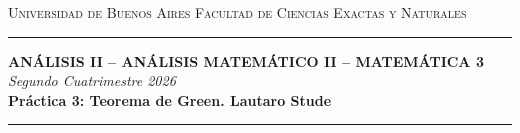 \documentclass[11pt, a4paper]{article}
\begin{document}
	
	\begin{center}
		\textsc{Universidad de Buenos Aires} \hfill \textsc{Facultad de Ciencias Exactas y Naturales} \\
		\vspace{0.15cm}
		\hrule
		\vspace{0.4cm}
		\textbf{\Large ANÁLISIS II -- ANÁLISIS MATEMÁTICO II -- MATEMÁTICA 3} \\
		\vspace{0.2cm}
		\textsl{Segundo Cuatrimestre 2026} \\
		\vspace{0.4cm}
		\textbf{\Large Práctica 3: Teorema de Green. Lautaro Stude}
		\vspace{0.25cm}
		\hrule
	\end{center}
	
	\vspace{0.5cm}
	
\end{document}
